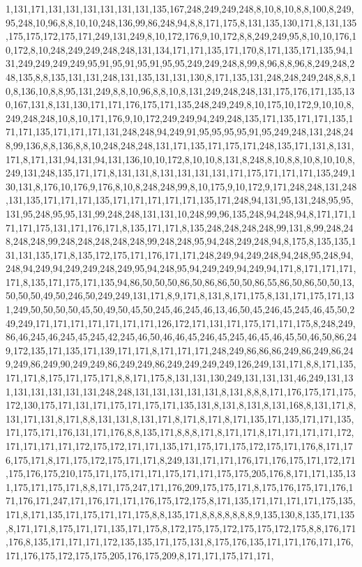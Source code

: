 1,131,171,131,131,131,131,131,131,135,167,248,249,249,248,8,10,8,10,8,8,100,8,249,95,248,10,96,8,8,10,10,248,136,99,86,248,94,8,8,171,175,8,131,135,130,171,8,131,135,175,175,172,175,171,249,131,249,8,10,172,176,9,10,172,8,8,249,249,95,8,10,10,176,10,172,8,10,248,249,249,248,248,131,134,171,171,135,171,170,8,171,135,171,135,94,131,249,249,249,249,95,91,95,91,95,91,95,95,249,249,248,8,99,8,96,8,8,96,8,249,248,248,135,8,8,135,131,131,248,131,135,131,131,130,8,171,135,131,248,248,249,248,8,8,10,8,136,10,8,8,95,131,249,8,8,10,96,8,8,10,8,131,249,248,248,131,175,176,171,135,130,167,131,8,131,130,171,171,176,175,171,135,248,249,249,8,10,175,10,172,9,10,10,8,249,248,248,10,8,10,171,176,9,10,172,249,249,94,249,248,135,171,135,171,171,135,171,171,135,171,171,171,131,248,248,94,249,91,95,95,95,95,91,95,249,248,131,248,248,99,136,8,8,136,8,8,10,248,248,248,131,171,135,171,175,171,248,135,171,131,8,131,171,8,171,131,94,131,94,131,136,10,10,172,8,10,10,8,131,8,248,8,10,8,8,10,8,10,10,8,249,131,248,135,171,171,8,131,131,8,131,131,131,131,171,175,171,171,171,135,249,130,131,8,176,10,176,9,176,8,10,8,248,248,99,8,10,175,9,10,172,9,171,248,248,131,248,131,135,171,171,171,135,171,171,171,171,171,135,171,248,94,131,95,131,248,95,95,131,95,248,95,95,131,99,248,248,131,131,10,248,99,96,135,248,94,248,94,8,171,171,171,171,175,131,171,176,171,8,135,171,171,8,135,248,248,248,248,99,131,8,99,248,248,248,248,99,248,248,248,248,248,99,248,248,95,94,248,249,248,94,8,175,8,135,135,131,131,135,171,8,135,172,175,171,176,171,171,248,249,94,249,248,94,248,95,248,94,248,94,249,94,249,249,248,249,95,94,248,95,94,249,249,94,249,94,171,8,171,171,171,171,8,135,171,175,171,135,94,86,50,50,50,86,50,86,86,50,50,86,55,86,50,86,50,50,13,50,50,50,49,50,246,50,249,249,131,171,8,9,171,8,131,8,171,175,8,131,171,175,171,131,249,50,50,50,50,45,50,49,50,45,50,245,46,245,46,13,46,50,45,246,45,245,46,45,50,249,249,171,171,171,171,171,171,171,126,172,171,131,171,175,171,171,175,8,248,249,86,46,245,46,245,45,245,42,245,46,50,46,46,45,246,45,245,46,45,46,45,50,46,50,86,249,172,135,171,135,171,139,171,171,8,171,171,171,248,249,86,86,86,249,86,249,86,249,249,86,249,90,249,249,86,249,249,86,249,249,249,249,126,249,131,171,8,8,171,135,171,171,8,175,171,175,171,8,8,171,175,8,131,131,130,249,131,131,131,46,249,131,131,131,131,131,131,131,248,248,131,131,131,131,131,8,131,8,8,8,171,176,175,171,175,172,130,175,171,131,171,175,171,175,171,135,131,8,131,8,131,8,131,168,8,131,171,8,131,171,131,8,171,8,8,131,131,8,131,171,8,171,8,171,8,171,135,171,135,171,171,135,171,175,171,176,131,171,176,8,8,135,171,8,8,8,171,8,171,171,8,171,171,171,171,172,171,171,171,171,172,175,172,171,171,135,171,175,171,175,172,175,171,176,8,171,176,175,171,8,171,175,172,175,171,171,8,249,131,171,171,176,171,176,175,171,172,171,175,176,175,210,175,171,175,171,171,175,171,171,175,175,205,176,8,171,171,135,131,175,171,175,171,8,8,171,175,247,171,176,209,175,175,171,8,175,176,175,171,176,171,176,171,247,171,176,171,171,176,175,172,175,8,171,135,171,171,171,171,175,135,171,8,171,135,171,175,171,171,175,8,8,135,171,8,8,8,8,8,8,8,9,135,130,8,135,171,135,8,171,171,8,175,171,171,135,171,175,8,172,175,175,172,175,175,172,175,8,8,176,171,176,8,135,171,171,171,172,135,135,171,175,131,8,175,176,135,171,171,176,171,176,171,176,175,172,175,175,205,176,175,209,8,171,171,175,171,171,